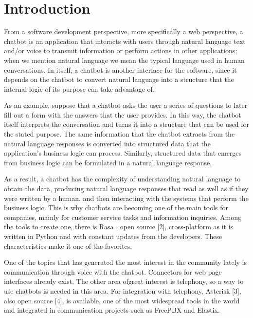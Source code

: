 {    \chapter{Introduction}
    
    From a software development perspective, more specifically a web perspective, a chatbot is an application that interacts with users through natural language text and/or voice to transmit information or perform actions in other applications; when we mention natural language we mean the typical language used in human conversations. In itself, a chatbot is another interface for the software, since it depends on the chatbot to convert natural language into a structure that the internal logic of its purpose can take advantage of.
    
    As an example, suppose that a chatbot asks the user a series of questions to later fill out a form with the answers that the user provides. In this way, the chatbot itself interprets the conversation and turns it into a structure that can be used for the stated purpose. The same information that the chatbot extracts from the natural language responses is converted into structured data that the application's business logic can process. Similarly, structured data that emerges from business logic can be formulated in a natural language response.
    
    As a result, a chatbot has the complexity of understanding natural language to obtain the data, producing natural language responses that read as well as if they were written by a human, and then interacting with the systems that perform the business logic.
    This is why chatbots are becoming one of the main tools for companies, mainly for customer service tasks and information inquiries. Among the tools to create one, there is Rasa \cite{rasadocs}, open source [2], cross-platform as it is written in Python and with constant updates from the developers. These characteristics make it one of the favorites.

    One of the topics that has generated the most interest in the community lately is communication through voice with the chatbot. Connectors for web page interfaces already exist. The other area of ​​great interest is telephony, so a way to use chatbots is needed in this area.
    For integration with telephony, Asterisk [3], also open source [4], is available, one of the most widespread tools in the world and integrated in communication projects such as FreePBX and Elastix.
}